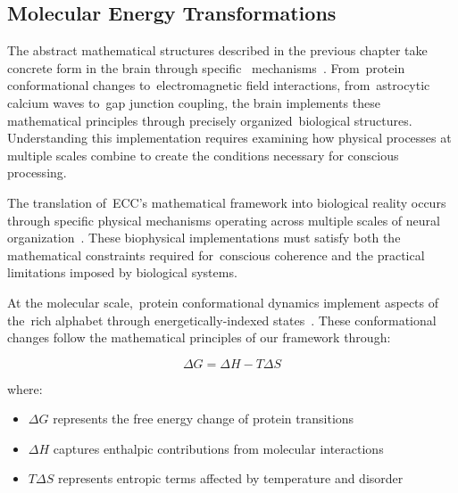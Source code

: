 
\subsection*{Molecular Energy Transformations~}

The abstract mathematical structures described in the previous chapter take concrete form in the brain through specific~ mechanisms~\cite{Baluska2016}. From~protein conformational changes to~electromagnetic field interactions, from~astrocytic calcium waves to~gap junction coupling, the brain implements these mathematical principles through precisely organized~biological structures. Understanding this implementation requires examining how physical processes at multiple scales combine to create the conditions necessary for conscious processing.

The translation of~ECC's mathematical framework into biological reality occurs through specific physical mechanisms operating across multiple scales of neural organization~\cite{breakspear2005dynamics}. These biophysical implementations must satisfy both the mathematical constraints required for~conscious coherence and the practical limitations imposed by biological systems.

At the molecular scale,~protein conformational dynamics implement aspects of the~rich alphabet through energetically-indexed states~\cite{Frauenfelder2009}. These conformational changes follow the mathematical principles of our framework through:

\begin{equation}
    \Delta G = \Delta H - T\Delta S
\end{equation}

where:
\begin{itemize}
    \item $\Delta G$ represents the free energy change of protein transitions
    \item $\Delta H$ captures enthalpic contributions from molecular interactions
    \item $T \Delta S$ represents entropic terms affected by temperature and disorder
\end{itemize}

